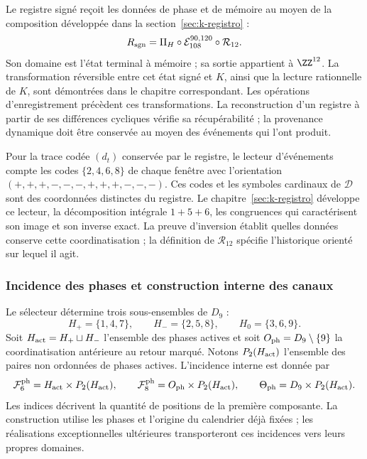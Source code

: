 Le registre signé reçoit les données de phase et de mémoire au moyen de la
composition développée dans la section~\ref{sec:k-registro} :
\begin{equation}
 R_{\rm sgn}=\Pi_H\circ\mathcal E_{108}^{90,120}
                         \circ\mathcal R_{12}.
 \label{tpk-int:registro-causal}
\end{equation}
Son domaine est l'état terminal à mémoire ; sa sortie appartient à
\(\ZZ^{12}\). La transformation réversible entre cet état signé
et \(K\), ainsi que la lecture rationnelle de \(K\), sont démontrées dans
le chapitre correspondant. Les opérations d'enregistrement précèdent
ces transformations. La reconstruction d'un registre à partir de ses
différences cycliques vérifie sa récupérabilité ; la provenance dynamique
doit être conservée au moyen des événements qui l'ont produit.

Pour la trace codée \((d_t)\) conservée par le registre, le
lecteur d'événements compte les codes \(\{2,4,6,8\}\) de chaque
fenêtre avec l'orientation
\((+,+,+,-,-,-,+,+,+,-,-,-)\). Ces codes et les symboles
cardinaux de \(\mathcal D\) sont des coordonnées distinctes du
registre. Le chapitre~\ref{sec:k-registro} développe ce lecteur,
la décomposition intégrale \(1+5+6\), les congruences qui
caractérisent son image et son inverse exact. La preuve d'inversion
établit quelles données conserve cette coordinatisation ; la définition de
\(\mathcal R_{12}\) spécifie l'historique orienté sur lequel
il agit.

\subsubsection{Incidence des phases et construction interne des canaux}
\label{tpk-int:incidencia}

Le sélecteur détermine trois sous-ensembles de \(D_9\) :
\[
 H_+=\{1,4,7\},\qquad H_-=\{2,5,8\},\qquad H_0=\{3,6,9\}.
\]
Soit \(H_{\rm act}=H_+\sqcup H_-\) l'ensemble des phases actives et
soit \(O_{\rm ph}=D_9\setminus\{9\}\) la coordinatisation antérieure au retour
marqué. Notons \(P_2(H_{\rm act})\) l'ensemble des paires
non ordonnées de phases actives. L'incidence interne est donnée par
\begin{equation}
 \mathcal F^{\rm ph}_6=H_{\rm act}\times P_2(H_{\rm act}),\qquad
 \mathcal F^{\rm ph}_8=O_{\rm ph}\times P_2(H_{\rm act}),\qquad
 \Theta_{\rm ph}=D_9\times P_2(H_{\rm act}).
 \label{tpk-int:fases90120}
\end{equation}
Les indices décrivent la quantité de positions de la première composante.
La construction utilise les phases et l'origine du calendrier déjà fixées ;
les réalisations exceptionnelles ultérieures transporteront ces
incidences vers leurs propres domaines.

